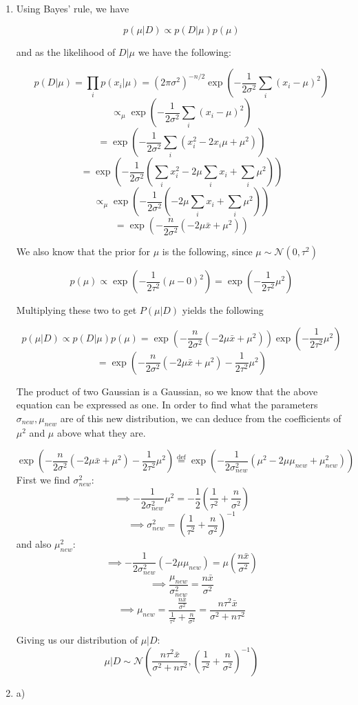 \documentclass[submit]{harvardml}
\begin{document}
\begin{enumerate}

\item 
Using Bayes' rule, we have

$$p(\mu|D) \propto p(D|\mu)p(\mu)$$

and as the likelihood of $D|\mu$ we have the following:

$$p(D|\mu) = \prod_i p(x_i|\mu) = (2\pi\sigma^2)^{-n/2}\exp\left(-\frac{1}{2\sigma^2} \sum_i (x_i-\mu)^2\right)$$
$$\propto_\mu \exp\left(-\frac{1}{2\sigma^2} \sum_i (x_i-\mu)^2\right) $$
$$ = \exp\left(-\frac{1}{2\sigma^2} \sum_i (x_i^2 - 2x_i\mu + \mu^2)\right) $$
$$ = \exp\left(-\frac{1}{2\sigma^2} \left(\sum_i x_i^2 - 2\mu \sum_i x_i + \sum_i \mu^2\right)\right) $$
$$ \propto_\mu \exp\left(-\frac{1}{2\sigma^2} \left( - 2\mu \sum_i x_i + \sum_i \mu^2\right)\right) $$
$$ = \exp\left(-\frac{n}{2\sigma^2} \left( - 2\mu \bar{x} + \mu^2\right)\right) $$

We also know that the prior for $\mu$ is the following, since $\mu\sim \mathcal{N}(0, \tau^2)$

$$p(\mu) \propto \exp\left(-\frac{1}{2\tau^2}  (\mu-0)^2\right) = \exp\left(-\frac{1}{2\tau^2}  \mu^2\right) $$

Multiplying these two to get $P(\mu|D)$ yields the following

$$p(\mu|D) \propto p(D|\mu)p(\mu) = \exp\left(-\frac{n}{2\sigma^2} \left( - 2\mu \bar{x} + \mu^2\right)\right)  \exp\left(-\frac{1}{2\tau^2}  \mu^2\right)$$
$$ = \exp\left(-\frac{n}{2\sigma^2} \left( - 2\mu \bar{x} + \mu^2\right) - \frac{1}{2\tau^2}  \mu^2\right)$$

The product of two Gaussian is a Gaussian, so we know that the above equation can be 
expressed as one. In order to find what the parameters $\sigma_{new}, \mu_{new}$ are of 
this new distribution, we can deduce from the coefficients of $\mu^2$ and $\mu$ above 
what they are.

$$\exp\left(-\frac{n}{2\sigma^2} \left( - 2\mu \bar{x} + \mu^2\right) - \frac{1}{2\tau^2}  \mu^2\right) \stackrel{\text{def}}{=} \exp\left(-\frac{1}{2\sigma_{new}^2}(\mu^2 - 2\mu\mu_{new} + \mu_{new}^2) \right)$$
First we find $\sigma_{new}^2$:
$$ \implies -\frac{1}{2\sigma_{new}^2} \mu^2  = -\frac{1}{2}\left(\frac{1}{\tau^2}+\frac{n}{\sigma^2}\right) $$
$$ \implies \sigma_{new}^2 = \left(\frac{1}{\tau^2}+\frac{n}{\sigma^2}\right)^{-1} $$
and also $\mu_{new}^2$:
$$ \implies  -\frac{1}{2\sigma_{new}^2} (-2\mu\mu_{new}) = \mu\left(\frac{n\bar{x}}{\sigma^2}\right)$$
$$ \implies  \frac{\mu_{new}}{\sigma_{new}^2} = \frac{n\bar{x}}{\sigma^2}$$
$$ \implies  \mu_{new}= \frac{\frac{n\bar{x}}{\sigma^2}}{\frac{1}{\tau^2}+\frac{n}{\sigma^2}}=\frac{n\tau^2\bar{x}}{\sigma^2+n\tau^2}$$


Giving us our distribution of $\mu|D$:
$$\mu|D\sim\mathcal{N}\left(\frac{n\tau^2\bar{x}}{\sigma^2+n\tau^2}, \left(\frac{1}{\tau^2}+\frac{n}{\sigma^2}\right)^{-1}\right)$$

\item

a) 

\end{enumerate}
\end{document}
